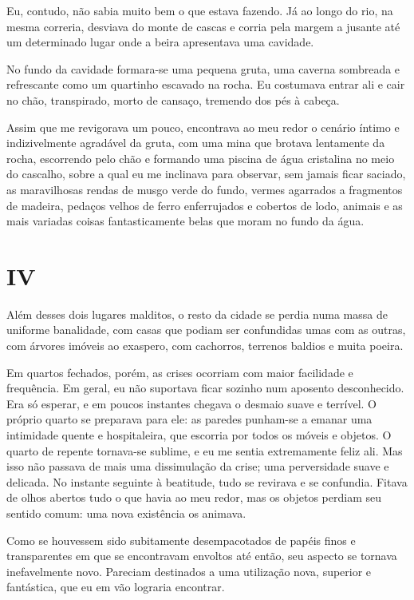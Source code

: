 Eu, contudo, não sabia muito bem o que estava fazendo. Já ao longo do rio, na mesma correria, desviava do monte de cascas e corria pela margem a jusante até um determinado lugar onde a beira apresentava uma cavidade.

No fundo da cavidade formara-se uma pequena gruta, uma caverna sombreada e refrescante como um quartinho escavado na rocha. Eu costumava entrar ali e cair no chão, transpirado, morto de cansaço, tremendo dos pés à cabeça.

Assim que me revigorava um pouco, encontrava ao meu redor o cenário íntimo e indizivelmente agradável da gruta, com uma mina que brotava lentamente da rocha, escorrendo pelo chão e formando uma piscina de água cristalina no meio do cascalho, sobre a qual eu me inclinava para observar, sem jamais ficar saciado, as maravilhosas rendas de musgo verde do fundo, vermes agarrados a fragmentos de madeira, pedaços velhos de ferro enferrujados e cobertos de lodo, animais e as mais variadas coisas fantasticamente belas que moram no fundo da água.


\chapter*{\centering\Large{IV}}

Além desses dois lugares malditos, o resto da cidade se perdia numa massa de uniforme banalidade, com casas que podiam ser confundidas umas com as outras, com árvores imóveis ao exaspero, com cachorros, terrenos baldios e muita poeira.

Em quartos fechados, porém, as crises ocorriam com maior facilidade e frequência. Em geral, eu não suportava ficar sozinho num aposento desconhecido. Era só esperar, e em poucos instantes chegava o desmaio suave e terrível. O próprio quarto se preparava para ele: as paredes punham-se a emanar uma intimidade quente e hospitaleira, que escorria por todos os móveis e objetos. O quarto de repente tornava-se sublime, e eu me sentia extremamente feliz ali. Mas isso não passava de mais uma dissimulação da crise; uma perversidade suave e delicada. No instante seguinte à beatitude, tudo se revirava e se confundia. Fitava de olhos abertos tudo o que havia ao meu redor, mas os objetos perdiam seu sentido comum: uma nova existência os animava.

Como se houvessem sido subitamente desempacotados de papéis finos e transparentes em que se encontravam envoltos até então, seu aspecto se tornava inefavelmente novo. Pareciam destinados a uma utilização nova, superior e fantástica, que eu em vão lograria encontrar.

